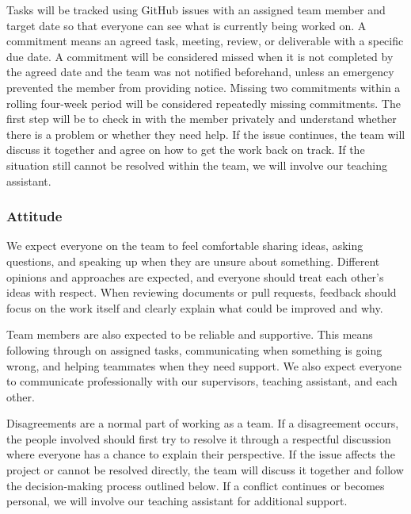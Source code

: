 \documentclass{article}
\begin{document}
    \bigskip
    Tasks will be tracked using GitHub issues with an assigned team member and
    target date so that everyone can see what is currently being worked on. A
    commitment means an agreed task, meeting, review, or deliverable with a
    specific due date. A commitment will be considered missed when it is not
    completed by the agreed date and the team was not notified beforehand, unless
    an emergency prevented the member from providing notice. Missing two
    commitments within a rolling four-week period will be considered repeatedly
    missing commitments. The first step will be to check in with the member
    privately and understand whether there is a problem or whether they need help.
    If the issue continues, the team will discuss it together and agree on how to
    get the work back on track. If the situation still cannot be resolved within
    the team, we will involve our teaching assistant.

\subsubsection*{Attitude}


We expect everyone on the team to feel comfortable sharing ideas, asking
questions, and speaking up when they are unsure about something. Different
opinions and approaches are expected, and everyone should treat each other's
ideas with respect. When reviewing documents or pull requests, feedback should
focus on the work itself and clearly explain what could be improved and why.

\bigskip
Team members are also expected to be reliable and supportive. This means
following through on assigned tasks, communicating when something is going
wrong, and helping teammates when they need support. We also expect everyone to
communicate professionally with our supervisors, teaching assistant, and each
other.

\bigskip
Disagreements are a normal part of working as a team. If a disagreement occurs,
the people involved should first try to resolve it through a respectful
discussion where everyone has a chance to explain their perspective. If the
issue affects the project or cannot be resolved directly, the team will discuss
it together and follow the decision-making process outlined below. If a conflict
continues or becomes personal, we will involve our teaching assistant for
additional support.
\end{document}
